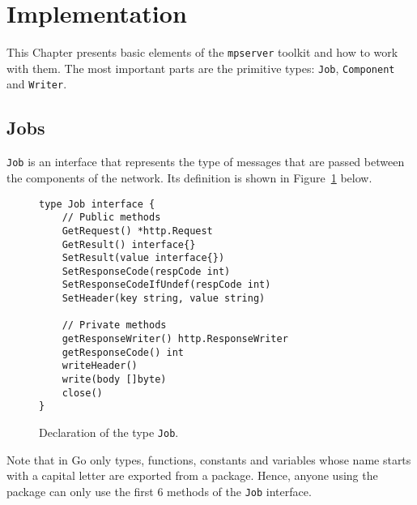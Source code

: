\section{Implementation}
\label{sec:impl}
This Chapter presents basic elements of the \texttt{mpserver} toolkit
and how to work with them. The most important parts are the primitive types:
\texttt{Job}, \texttt{Component} and \texttt{Writer}.

\subsection{Jobs}
\texttt{Job} is an interface that represents the type of messages that are
passed between the components of the network. Its definition is shown
in Figure~\ref{fig:Job} below.

\begin{figure}[h]
\centering
\begin{lstlisting}
type Job interface {
    // Public methods
    GetRequest() *http.Request
    GetResult() interface{}
    SetResult(value interface{})
    SetResponseCode(respCode int)
    SetResponseCodeIfUndef(respCode int)
    SetHeader(key string, value string)

    // Private methods
    getResponseWriter() http.ResponseWriter
    getResponseCode() int
    writeHeader()
    write(body []byte)
    close()
}
\end{lstlisting}
\caption[scale=1.0]{Declaration of the type \texttt{Job}.}
\label{fig:Job}
\end{figure}

Note that in Go only types, functions, constants and variables whose name
starts with a capital letter are exported from a package. Hence, anyone
using the package can only use the first 6 methods of the \texttt{Job}
interface.

